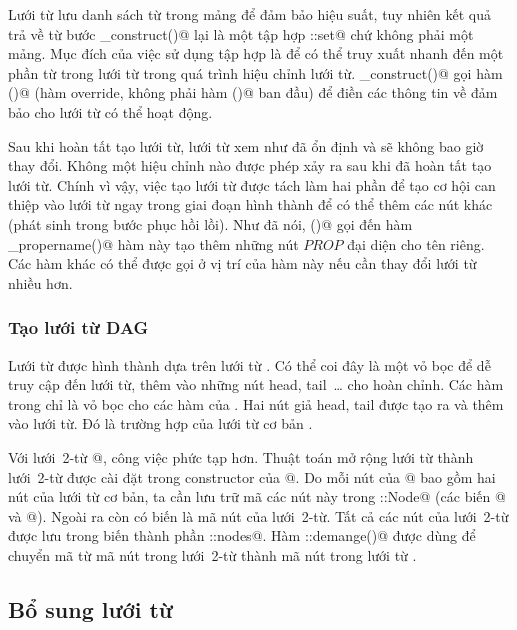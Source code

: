 \documentclass[a4paper,oneside,14pt]{extbook} %
\begin{document}
Lưới từ lưu danh sách từ trong mảng để đảm bảo hiệu suất, tuy nhiên
kết quả trả về từ bước \verb@pre_construct()@ 
lại là một tập hợp \verb@std::set@ chứ không phải một mảng. Mục đích
của việc sử dụng tập hợp là để có thể truy xuất nhanh đến một phần từ
trong lưới từ trong quá trình hiệu chỉnh lưới
từ. \verb@post_construct()@ gọi hàm \verb@construct()@ (hàm override,
không phải hàm \verb@construct()@ ban đầu) để điền các thông tin về
\verb@WordInfos@ đảm bảo cho lưới từ có thể hoạt động.

Sau khi hoàn tất tạo lưới từ, lưới từ xem như đã ổn định và sẽ không
bao giờ thay đổi. Không một hiệu chỉnh nào được phép xảy ra sau khi đã
hoàn tất tạo lưới từ. Chính vì vậy, việc tạo lưới từ được tách làm hai
phần để tạo cơ hội can thiệp vào lưới từ ngay trong giai đoạn hình
thành để có thể thêm các nút khác (phát sinh trong bước phục hồi
lồi). Như đã nói, \verb@construct()@ gọi đến hàm
\verb@mark_propername()@ hàm này tạo thêm những nút $PROP$ đại diện
cho tên riêng. Các hàm khác có thể được gọi ở vị trí của hàm này nếu
cần thay đổi lưới từ nhiều hơn.

\subsubsection{Tạo lưới từ DAG}

Lưới từ \verb@DAG@ được hình thành dựa trên lưới từ \verb@Lattice@. Có
thể coi đây là một vỏ bọc để dễ truy cập đến lưới từ, thêm vào những
nút head, tail~\ldots{} cho hoàn chỉnh. Các hàm trong \verb@DAG@ chỉ
là vỏ bọc cho các hàm của \verb@Lattice@. Hai nút giả head, tail được
tạo ra và thêm vào lưới từ. Đó là trường hợp của lưới từ cơ bản
\verb@WordDAG@. 

Với lưới~2-từ @, công việc phức tạp hơn. Thuật toán mở
rộng lưới từ thành lưới~2-từ được cài đặt trong constructor của
@.  Do mỗi nút của @ bao gồm hai nút của
lưới từ cơ bản, ta cần lưu trữ mã các nút này trong
::Node@ (các biến @ và @). Ngoài ra còn
có biến \verb@id@ là mã nút của lưới~2-từ. Tất cả các nút của
lưới~2-từ được lưu trong biến thành phần ::nodes@. Hàm
::demange()@ được dùng để chuyển mã từ mã nút trong
lưới~2-từ thành mã nút trong lưới từ \verb@WordDAG@.



\subsection{Bổ sung lưới từ}
\end{document}

